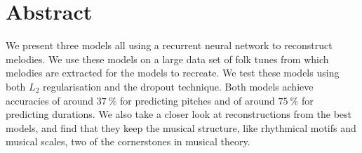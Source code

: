 \section*{Abstract}
\label{sec:abstract}

We present three models all using a recurrent neural network to reconstruct melodies.
We use these models on a large data set of folk tunes from which melodies are extracted for the models to recreate.
We test these models using both $L_2$ regularisation and the dropout technique.
Both models achieve accuracies of around $\SI{37}{\%}$ for predicting pitches and of around $\SI{75}{\%}$ for predicting durations.
We also take a closer look at reconstructions from the best models, and find that they keep the musical structure, like rhythmical motifs and musical scales, two of the cornerstones in musical theory.

